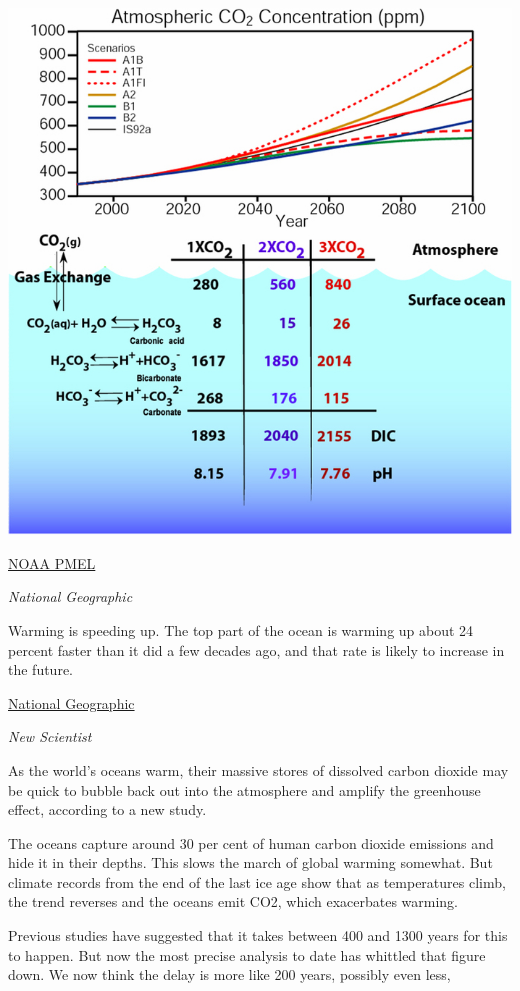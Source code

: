 \documentclass[
]{book}
\begin{document}
\includegraphics{fig/ocean_atmosphere_concentration.jpg}

\href{https://www.pmel.noaa.gov/co2/story/Ocean+Carbon+Uptake}{NOAA PMEL}

\emph{National Geographic}

Warming is speeding up. The top part of the ocean is warming up about 24 percent faster than it did a few decades ago, and that rate is likely to increase in the future.

\href{https://www.nationalgeographic.com/environment/article/critical-issues-sea-temperature-rise}{National Geographic}

\emph{New Scientist}

As the world's oceans warm, their massive stores of dissolved carbon dioxide may be quick to bubble back out into the atmosphere and amplify the greenhouse effect, according to a new study.

The oceans capture around 30 per cent of human carbon dioxide emissions and hide it in their depths. This slows the march of global warming somewhat. But climate records from the end of the last ice age show that as temperatures climb, the trend reverses and the oceans emit CO2, which exacerbates warming.

Previous studies have suggested that it takes between 400 and 1300 years for this to happen. But now the most precise analysis to date has whittled that figure down.
We now think the delay is more like 200 years, possibly even less,
\end{document}
